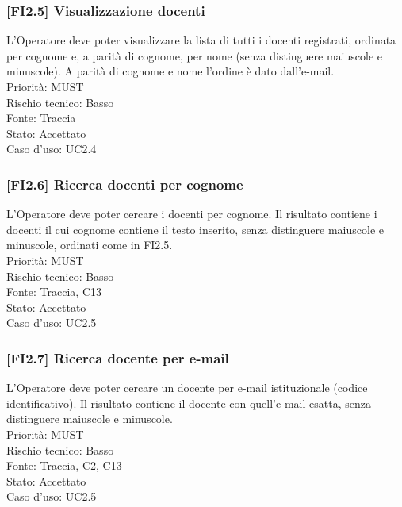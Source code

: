 \subsubsection{[FI2.5] Visualizzazione docenti}
L'Operatore deve poter visualizzare la lista di tutti i docenti registrati, ordinata per cognome e, a parità di cognome, per nome (senza distinguere maiuscole e minuscole). A parità di cognome e nome l'ordine è dato dall'e-mail.\\
Priorità: MUST\\Rischio tecnico: Basso\\Fonte: Traccia\\Stato: Accettato\\Caso d'uso: UC2.4

\subsubsection{[FI2.6] Ricerca docenti per cognome}
L'Operatore deve poter cercare i docenti per cognome. Il risultato contiene i docenti il cui cognome contiene il testo inserito, senza distinguere maiuscole e minuscole, ordinati come in FI2.5.\\
Priorità: MUST\\Rischio tecnico: Basso\\Fonte: Traccia, C13\\Stato: Accettato\\Caso d'uso: UC2.5

\subsubsection{[FI2.7] Ricerca docente per e-mail}
L'Operatore deve poter cercare un docente per e-mail istituzionale (codice identificativo). Il risultato contiene il docente con quell'e-mail esatta, senza distinguere maiuscole e minuscole.\\
Priorità: MUST\\Rischio tecnico: Basso\\Fonte: Traccia, C2, C13\\Stato: Accettato\\Caso d'uso: UC2.5
